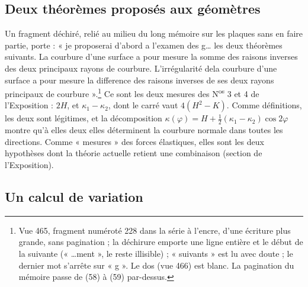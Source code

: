 \documentclass[11pt,a4paper]{article}
\begin{document}
\subsection*{Deux théorèmes proposés aux géomètres}

Un fragment déchiré, relié au milieu du long mémoire sur les plaques sans en
faire partie, porte : « je proposerai d'abord a l'examen des g… les deux
théorèmes suivants. La courbure d'une surface a pour mesure la somme des raisons
inverses des deux principaux rayons de courbure. L'irrégularité dela courbure
d'une surface a pour mesure la difference des raisons inverses de ses deux rayons
principaux de courbure ».\footnote{Vue 465, fragment numéroté 228 dans la série à
l'encre, d'une écriture plus grande, sans pagination ; la déchirure emporte une
ligne entière et le début de la suivante (« …ment », le reste illisible) ;
« suivants » est lu avec doute ; le dernier mot s'arrête sur « g ». Le dos (vue
466) est blanc. La pagination du mémoire passe de (58) à (59) par-dessus.} Ce sont
les deux mesures des N\textsuperscript{os} 3 et 4 de l'Exposition : $2H$, et
$\kappa_1 - \kappa_2$, dont le carré vaut $4(H^2-K)$. Comme définitions, les deux
sont légitimes, et la décomposition $\kappa(\varphi) = H +
\frac12(\kappa_1-\kappa_2)\cos 2\varphi$ montre qu'à elles deux elles déterminent la
courbure normale dans toutes les directions. Comme « mesures » des forces
élastiques, elles sont les deux hypothèses dont la théorie actuelle retient une
combinaison (section de l'Exposition).

\subsection*{Un calcul de variation}
\end{document}
